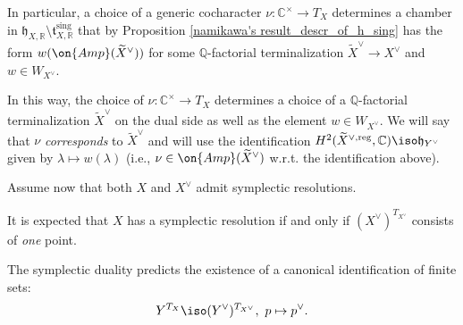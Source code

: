 \documentclass[12pt]{amsart}
\begin{document}
In particular, a choice of a generic cocharacter $\nu\colon \mathbb{C}^\times \rightarrow T_{X}$ determines a chamber in $\mathfrak{h}_{X,\mathbb{R}} \setminus \mathfrak{t}_{X,\mathbb{R}}^{\mathrm{sing}}$ that by Proposition \ref{namikawa's result_descr_of_h_sing}  has the form $w(\on{Amp}(\widetilde{X}^{\vee}))$ for some $\mathbb{Q}$-factorial terminalization $\widetilde{X}^\vee \rightarrow X^\vee$ and $w \in W_{X^\vee}$.



In this way, the choice of $\nu\colon \mathbb{C}^\times \rightarrow T_{X}$ determines a choice of a $\mathbb{Q}$-factorial terminalization $\widetilde{X}^\vee$ on the dual side as well as the element $w \in W_{X^\vee}$. We will say that $\nu$ {\emph{corresponds}} to $\widetilde{X}^\vee$ and will use the identification $H^2(\widetilde{X}^{\vee,\mathrm{reg}},\mathbb{C}) \iso \mathfrak{h}_{Y^\vee}$ given by $\lambda \mapsto w(\lambda)$ (i.e., $\nu \in \on{Amp}(\widetilde{X}^\vee)$ w.r.t. the identification above).






Assume now that both $X$ and $X^\vee$ admit symplectic resolutions.

\begin{rmk}\label{symplectic resolution iff one fixed point}
It is expected that $X$ has a symplectic resolution if and only if $(X^\vee)^{T_{X^\vee}}$ consists of {\emph{one}} point.    
\end{rmk}

The symplectic duality predicts the existence of a canonical identification of finite sets:
\begin{equation}\label{canonical:)_ident_fixed_points}
Y^{T_X} \iso (Y^\vee)^{T_{X^\vee}},~p \mapsto p^\vee.
\end{equation}
\end{document}
